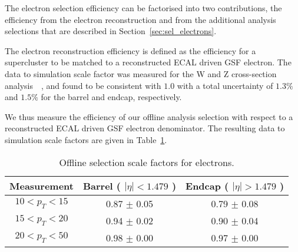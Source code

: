 
The electron selection efficiency can be factorised into two contributions,
the efficiency from the electron reconstruction and from the additional
analysis selections that are described in Section~\ref{sec:sel_electrons}.

The electron reconstruction efficiency is defined as the efficiency for a
supercluster to be matched to a reconstructed ECAL driven GSF electron.
The data to simulation scale factor was measured for the W and Z cross-section
analysis~\cite{VBTFCrossSectionNote}~\cite{ref:tagprobe_mit_w},
and found to be consistent with $1.0$ with a total uncertainty of
$1.3\%$ and $1.5\%$ for the barrel and endcap, respectively.

We thus measure the efficiency of our offline analysis selection 
with respect to a reconstructed ECAL driven GSF electron denominator. 
The resulting data to simulation scale factors are given in Table~\ref{tab:eff_ele_offline}.

\begin{table}[!ht]
\begin{center}
\begin{tabular}{c|c|c}
\hline
Measurement & Barrel ( $|\eta|<1.479$ )   & Endcap ( $|\eta|>1.479$ )  \\ 
\hline
$  10<p_T<  15$ & 0.87 $\pm$ 0.05  & 0.79 $\pm$ 0.08  \\ \hline 
$  15<p_T<  20$ & 0.94 $\pm$ 0.02  & 0.90 $\pm$ 0.04  \\ \hline 
$  20<p_T<  50$ & 0.98 $\pm$ 0.00  & 0.97 $\pm$ 0.00  \\ \hline 
\end{tabular}
\caption{Offline selection scale factors for electrons.}
\label{tab:eff_ele_offline}
\end{center}
\end{table}

